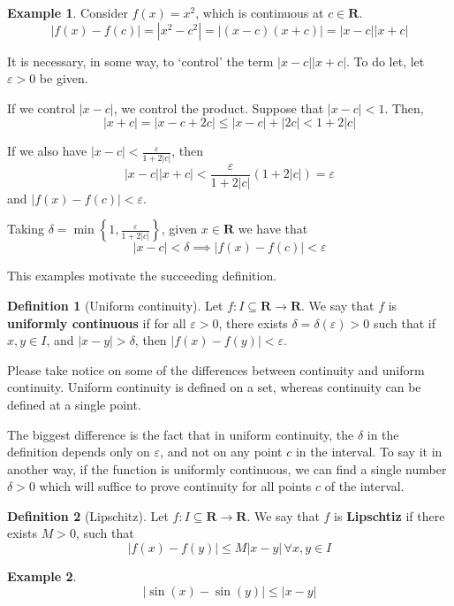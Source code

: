 \documentclass[12pt,a4paper]{article}
\theoremstyle{definition}
\newtheorem{example}{Example}[section]
\newtheorem{definition}{Definition}[section]
\begin{document}
\begin{example}
	Consider $f(x) = x^2$, which is continuous at $c \in \textbf{R}$. 
	\[
		| f(x) - f(c) | = |x^2 - c^2| = |(x-c)(x+c)| = |x-c| |x+c|
	\]
	
	It is necessary, in some way, to `control' the term $|x-c| |x+c|$. To do let, let $\varepsilon > 0$ be given.
	
	If we control $|x-c|$, we control the product. Suppose that $|x-c| < 1$. Then,
	\[
		|x+c| = |x-c + 2c| \leq |x-c| + |2c| < 1 + 2|c|
	\]
	
	If we also have $| x- c | < \frac{\varepsilon}{1 + 2 |c|}$, then
	\[
		|x-c| |x+c| < \frac{\varepsilon}{1+2|c|} (1+2|c|) = \varepsilon
	\]
	and $|f(x) - f(c)| < \varepsilon$.
	
	Taking $\delta = \min \left\{ 1, \frac{\varepsilon}{1+2|c|} \right\}$, given $x \in \textbf{R}$ we have that 
	\[
		|x-c| < \delta \implies |f(x) - f(c)| < \varepsilon
	\]
\end{example}

This examples motivate the succeeding definition.

\begin{definition}[Uniform continuity]
	Let $f : I \subseteq \textbf{R} \longrightarrow \textbf{R}$. We say that $f$ is \textbf{uniformly continuous} if for all $\varepsilon > 0$, there exists $\delta = \delta(\varepsilon) > 0$ such that if $x, y \in I$, and $|x-y| > \delta$, then $|f(x) - f(y)| < \varepsilon$.
\end{definition}

Please take notice on some of the differences between continuity and uniform continuity. Uniform continuity is defined on a set, whereas continuity can be defined at a single point.

The biggest difference is the fact that in uniform continuity, the $\delta$ in the definition depends only on $\varepsilon$, and not on any point $c$ in the interval. To say it in another way, if the function is uniformly continuous, we can find a single number $\delta > 0$ which will suffice to prove continuity for all points $c$ of the interval.

\begin{definition}[Lipschitz]
	Let $f : I \subseteq \textbf{R} \longrightarrow \textbf{R}$. We say that $f$ is \textbf{Lipschtiz} if there exists $M > 0$, such that 
	\[
		|f(x) - f(y) | \leq M |x-y| \, \forall x,y \in I
	\]
\end{definition}

\begin{example}
	\[
		| \sin(x) - \sin(y) | \leq |x-y|
	\]
\end{example}
\end{document}
